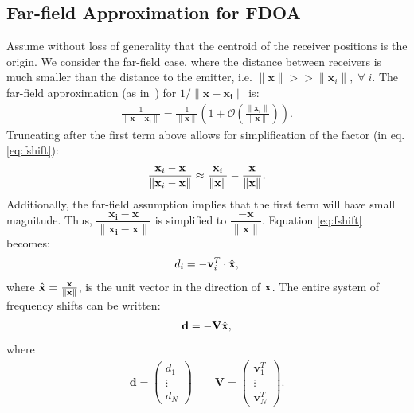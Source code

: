 \subsection{Far-field Approximation for FDOA}
Assume without loss of generality that the centroid of the receiver positions is the origin. We consider the far-field case, where the distance between receivers is much smaller than the distance to the emitter, i.e. $\|\mathbf{x}\|>>\|\mathbf{x}_i\|, \; \forall \; i$. The far-field approximation (as in~\cite{Cheney2009}) for $1/\|\mathbf{x-x_i}\|$ is:
\begin{align*}
  \frac{1}{\|\mathbf{x-x_i}\|} = \frac{1}{\|\mathbf{x}\|}\left(1+\mathcal{O}\left(\frac{\|\mathbf{x}_i\|}{\|\mathbf{x}\|}\right)\right).
\end{align*}
Truncating after the first term above allows for simplification of the factor (in eq. \ref{eq:fshift}):
\begin{align*}
  \frac{\mathbf{x}_i-\mathbf{x}}{\|\mathbf{x}_i-\mathbf{x}\|} \approx \frac{\mathbf{x}_i}{\|\mathbf{x}\|}-\frac{\mathbf{x}}{\|\mathbf{x}\|}.
\end{align*}
Additionally, the far-field assumption implies that the first term will have small magnitude. Thus, $\dfrac{\mathbf{x_i-x}}{\|\mathbf{x_i-x}\|}$ is simplified to $\dfrac{-\mathbf{x}}{\|\mathbf{x}\|}$.
Equation \ref{eq:fshift} becomes:
\begin{align}
  d_i =  -\mathbf{v}_i^T\cdot\hat{\mathbf{x}},
\end{align}
where $\hat{\mathbf{x}} = \frac{\mathbf{x}}{\|\mathbf{x}\|}$, is the unit vector in the direction of $\mathbf{x}$. The entire system of frequency shifts can be written:
\begin{align}
  \label{eq:fshiftFF}
\mathbf{d} = -\mathbf{V}\hat{\mathbf{x}},
\end{align}
where \begin{align*}
\mathbf{d}=\begin{pmatrix}
d_1 \\ \vdots \\ d_N
\end{pmatrix}
\qquad
\mathbf{V}=\begin{pmatrix}
\mathbf{v}_1^T \\ \vdots\\ \mathbf{v}_N^T
\end{pmatrix}.
\end{align*}

